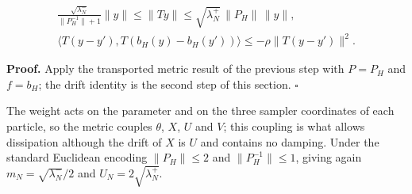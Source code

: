 \documentclass[11pt,a4paper]{report}
\begin{document}
\[\begin{gathered}\frac{\sqrt{\lambda_N^-}}{\|P_H^{-1}\|+1}\|y\|\le\|Ty\|\le\sqrt{\lambda_N^+}\,\|P_H\|\,\|y\|,\\ \bigl\langle T(y-y'),T(b_H(y)-b_H(y'))\bigr\rangle\le-\rho\|T(y-y')\|^2 .\end{gathered}\]


\textbf{Proof.} Apply the transported metric result of the previous step with \(P=P_H\) and \(f=b_H\); the drift identity is the second step of this section. \(\square\)




The weight acts on the parameter and on the three sampler coordinates of each particle, so the metric couples \(\theta\), \(X\), \(U\) and \(V\); this coupling is what allows dissipation although the drift of \(X\) is \(U\) and contains no damping. Under the standard Euclidean encoding \(\|P_H\|\le2\) and \(\|P_H^{-1}\|\le1\), giving again \(m_N=\sqrt{\lambda_N^-}/2\) and \(U_N=2\sqrt{\lambda_N^+}\).
\end{document}
